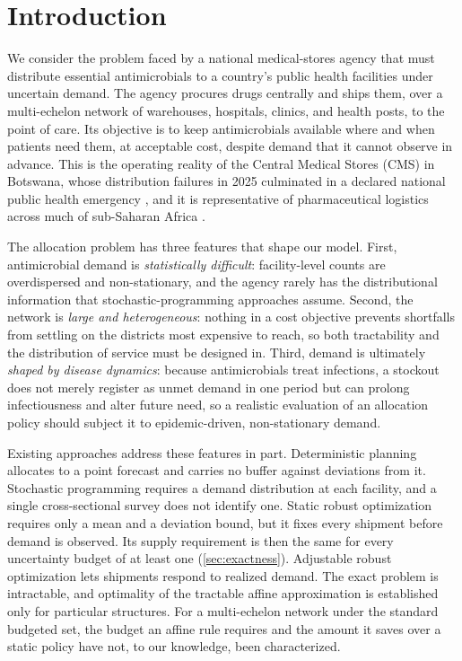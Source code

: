 \documentclass[11pt]{article}
\begin{document}
\section{Introduction}
\label{sec:intro}

We consider the problem faced by a national medical-stores agency that must distribute essential antimicrobials to a country's public health facilities under uncertain demand.
The agency procures drugs centrally and ships them, over a multi-echelon network of warehouses, hospitals, clinics, and health posts, to the point of care.
Its objective is to keep antimicrobials available where and when patients need them, at acceptable cost, despite demand that it cannot observe in advance.
This is the operating reality of the Central Medical Stores (CMS) in Botswana, whose distribution failures in 2025 culminated in a declared national public health emergency \citep{reut25}, and it is representative of pharmaceutical logistics across much of sub-Saharan Africa \citep{adebisi2022,olutuase2022}.

The allocation problem has three features that shape our model.
First, antimicrobial demand is \emph{statistically difficult}: facility-level counts are overdispersed and non-stationary, and the agency rarely has the distributional information that stochastic-programming approaches assume.
Second, the network is \emph{large and heterogeneous}: nothing in a cost objective prevents shortfalls from settling on the districts most expensive to reach, so both tractability and the distribution of service must be designed in.
Third, demand is ultimately \emph{shaped by disease dynamics}: because antimicrobials treat infections, a stockout does not merely register as unmet demand in one period but can prolong infectiousness and alter future need, so a realistic evaluation of an allocation policy should subject it to epidemic-driven, non-stationary demand.

Existing approaches address these features in part.
Deterministic planning allocates to a point forecast and carries no buffer against deviations from it.
Stochastic programming requires a demand distribution at each facility, and a single cross-sectional survey does not identify one.
Static robust optimization requires only a mean and a deviation bound, but it fixes every shipment before demand is observed.
Its supply requirement is then the same for every uncertainty budget of at least one (\Sec\ref{sec:exactness}).
Adjustable robust optimization lets shipments respond to realized demand.
The exact problem is intractable, and optimality of the tractable affine approximation is established only for particular structures.
For a multi-echelon network under the standard budgeted set, the budget an affine rule requires and the amount it saves over a static policy have not, to our knowledge, been characterized.
\end{document}
